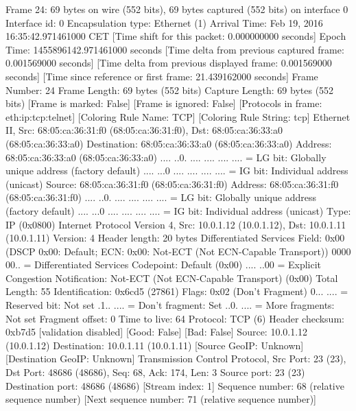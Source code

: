 Frame 24: 69 bytes on wire (552 bits), 69 bytes captured (552 bits) on interface 0
    Interface id: 0
    Encapsulation type: Ethernet (1)
    Arrival Time: Feb 19, 2016 16:35:42.971461000 CET
    [Time shift for this packet: 0.000000000 seconds]
    Epoch Time: 1455896142.971461000 seconds
    [Time delta from previous captured frame: 0.001569000 seconds]
    [Time delta from previous displayed frame: 0.001569000 seconds]
    [Time since reference or first frame: 21.439162000 seconds]
    Frame Number: 24
    Frame Length: 69 bytes (552 bits)
    Capture Length: 69 bytes (552 bits)
    [Frame is marked: False]
    [Frame is ignored: False]
    [Protocols in frame: eth:ip:tcp:telnet]
    [Coloring Rule Name: TCP]
    [Coloring Rule String: tcp]
Ethernet II, Src: 68:05:ca:36:31:f0 (68:05:ca:36:31:f0), Dst: 68:05:ca:36:33:a0 (68:05:ca:36:33:a0)
    Destination: 68:05:ca:36:33:a0 (68:05:ca:36:33:a0)
        Address: 68:05:ca:36:33:a0 (68:05:ca:36:33:a0)
        .... ..0. .... .... .... .... = LG bit: Globally unique address (factory default)
        .... ...0 .... .... .... .... = IG bit: Individual address (unicast)
    Source: 68:05:ca:36:31:f0 (68:05:ca:36:31:f0)
        Address: 68:05:ca:36:31:f0 (68:05:ca:36:31:f0)
        .... ..0. .... .... .... .... = LG bit: Globally unique address (factory default)
        .... ...0 .... .... .... .... = IG bit: Individual address (unicast)
    Type: IP (0x0800)
Internet Protocol Version 4, Src: 10.0.1.12 (10.0.1.12), Dst: 10.0.1.11 (10.0.1.11)
    Version: 4
    Header length: 20 bytes
    Differentiated Services Field: 0x00 (DSCP 0x00: Default; ECN: 0x00: Not-ECT (Not ECN-Capable Transport))
        0000 00.. = Differentiated Services Codepoint: Default (0x00)
        .... ..00 = Explicit Congestion Notification: Not-ECT (Not ECN-Capable Transport) (0x00)
    Total Length: 55
    Identification: 0x6cd5 (27861)
    Flags: 0x02 (Don't Fragment)
        0... .... = Reserved bit: Not set
        .1.. .... = Don't fragment: Set
        ..0. .... = More fragments: Not set
    Fragment offset: 0
    Time to live: 64
    Protocol: TCP (6)
    Header checksum: 0xb7d5 [validation disabled]
        [Good: False]
        [Bad: False]
    Source: 10.0.1.12 (10.0.1.12)
    Destination: 10.0.1.11 (10.0.1.11)
    [Source GeoIP: Unknown]
    [Destination GeoIP: Unknown]
Transmission Control Protocol, Src Port: 23 (23), Dst Port: 48686 (48686), Seq: 68, Ack: 174, Len: 3
    Source port: 23 (23)
    Destination port: 48686 (48686)
    [Stream index: 1]
    Sequence number: 68    (relative sequence number)
    [Next sequence number: 71    (relative sequence number)]
